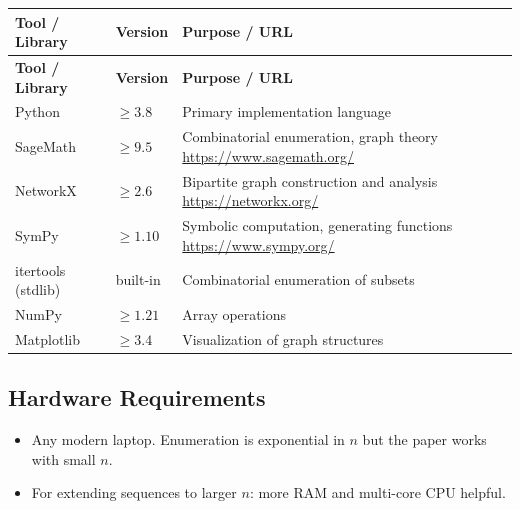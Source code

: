 \documentclass[11pt,a4paper]{article}
\begin{document}
\begin{longtable}{p{4.5cm} p{2.5cm} p{6.5cm}}
\toprule
\textbf{Tool / Library} & \textbf{Version} & \textbf{Purpose / URL} \\
\midrule
\endfirsthead
\toprule
\textbf{Tool / Library} & \textbf{Version} & \textbf{Purpose / URL} \\
\midrule
\endhead
Python & $\geq 3.8$ & Primary implementation language \\
\midrule
SageMath & $\geq 9.5$ & Combinatorial enumeration, graph theory \newline \url{https://www.sagemath.org/} \\
\midrule
NetworkX & $\geq 2.6$ & Bipartite graph construction and analysis \newline \url{https://networkx.org/} \\
\midrule
SymPy & $\geq 1.10$ & Symbolic computation, generating functions \newline \url{https://www.sympy.org/} \\
\midrule
itertools (stdlib) & built-in & Combinatorial enumeration of subsets \\
\midrule
NumPy & $\geq 1.21$ & Array operations \\
\midrule
Matplotlib & $\geq 3.4$ & Visualization of graph structures \\
\bottomrule
\end{longtable}

\subsection{Hardware Requirements}
\begin{itemize}
  \item Any modern laptop. Enumeration is exponential in $n$ but the paper works with small $n$.
  \item For extending sequences to larger $n$: more RAM and multi-core CPU helpful.
\end{itemize}
\end{document}
